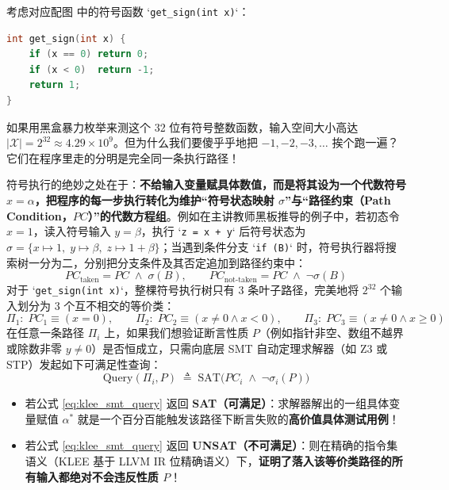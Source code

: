 \documentclass[a4paper]{article}
\begin{document}
考虑对应配图 中的符号函数 `\texttt{get\_sign(int x)}`：
\begin{lstlisting}[language=C, caption={KLEE 符号执行入门示例 \texttt{get\_sign}}]
int get_sign(int x) {
    if (x == 0) return 0;
    if (x < 0)  return -1;
    return 1;
}
\end{lstlisting}
如果用黑盒暴力枚举来测这个 32 位有符号整数函数，输入空间大小高达 $|\mathcal{X}| = 2^{32} \approx 4.29 \times 10^9$。但为什么我们要傻乎乎地把 $-1, -2, -3, \dots$ 挨个跑一遍？它们在程序里走的分明是完全同一条执行路径！

符号执行的绝妙之处在于：\textbf{不给输入变量赋具体数值，而是将其设为一个代数符号 $x = \alpha$，把程序的每一步执行转化为维护“符号状态映射 $\sigma$”与“路径约束（Path Condition，$\mathit{PC}$）”的代数方程组}。例如在主讲教师黑板推导的例子中，若初态令 $x = 1$，读入符号输入 $y = \beta$，执行 `\texttt{z = x + y}` 后符号状态为 $\sigma = \{x \mapsto 1,\; y \mapsto \beta,\; z \mapsto 1 + \beta\}$；当遇到条件分支 `\texttt{if (B)}` 时，符号执行器将搜索树一分为二，分别把分支条件及其否定追加到路径约束中：
\begin{equation}
\mathit{PC}_{\text{taken}} = \mathit{PC} \;\land\; \sigma(B), \qquad
\mathit{PC}_{\text{not-taken}} = \mathit{PC} \;\land\; \neg \sigma(B)
\label{eq:symbolic_execution_branch}
\end{equation}
对于 `\texttt{get\_sign(int x)}`，整棵符号执行树只有 $3$ 条叶子路径，完美地将 $2^{32}$ 个输入划分为 $3$ 个互不相交的等价类：
\begin{equation}
\Pi_1:\; \mathit{PC}_1 \equiv (x = 0), \qquad
\Pi_2:\; \mathit{PC}_2 \equiv (x \neq 0 \land x < 0), \qquad
\Pi_3:\; \mathit{PC}_3 \equiv (x \neq 0 \land x \ge 0)
\label{eq:klee_three_partitions}
\end{equation}
在任意一条路径 $\Pi_i$ 上，如果我们想验证断言性质 $P$（例如指针非空、数组不越界或除数非零 $y \neq 0$）是否恒成立，只需向底层 SMT 自动定理求解器（如 Z3 或 STP）发起如下可满足性查询：
\begin{equation}
\mathrm{Query}(\Pi_i, P) \;\triangleq\; \mathrm{SAT}\!\big(\mathit{PC}_i \;\land\; \neg \sigma_i(P)\big)
\label{eq:klee_smt_query}
\end{equation}
\begin{itemize}
    \item 若公式 \eqref{eq:klee_smt_query} 返回 \textbf{SAT（可满足）}：求解器解出的一组具体变量赋值 $\alpha^*$ 就是一个百分百能触发该路径下断言失败的\textbf{高价值具体测试用例}！
    \item 若公式 \eqref{eq:klee_smt_query} 返回 \textbf{UNSAT（不可满足）}：则在精确的指令集语义（KLEE 基于 LLVM IR 位精确语义）下，\textbf{证明了落入该等价类路径的所有输入都绝对不会违反性质 $P$}！
\end{itemize}
\end{document}
